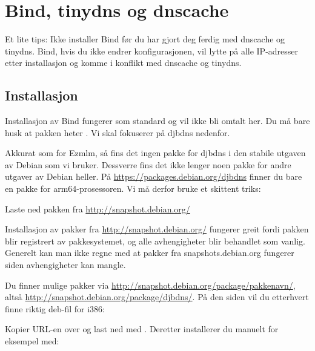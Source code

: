 \chapter{Bind, tinydns og dnscache} %


Et lite tips: Ikke installer Bind før du har gjort deg ferdig med
dnscache og tinydns. Bind, hvis du ikke endrer konfigurasjonen, vil
lytte på alle IP-adresser etter installasjon og komme i konflikt med
dnscache og tinydns.
 
\section{Installasjon}

Installasjon av Bind fungerer som standard og vil ikke bli omtalt her. 
Du må bare husk at pakken heter . Vi skal fokuserer på djbdns nedenfor.

Akkurat som for Ezmlm, så fins det ingen pakke for djbdns i den stabile utgaven av Debian som vi bruker.
Dessverre fins det ikke lenger noen pakke for andre utgaver av Debian heller. 
På \url{https://packages.debian.org/djbdns} finner du bare en pakke for arm64-prosessoren. 
Vi må derfor bruke et skittent triks:

Laste ned pakken fra \url{http://snapshot.debian.org/}

Installasjon av pakker fra \url{http://snapshot.debian.org/} fungerer greit fordi 
pakken blir registrert av pakkesystemet, og alle avhengigheter blir behandlet som vanlig. 
Generelt kan man ikke regne med at pakker fra snapshots.debian.org fungerer siden avhengigheter
kan mangle.

Du finner mulige pakker via \url{http://snapshot.debian.org/package/pakkenavn/}, altså 
\url{http://snapshot.debian.org/package/djbdns/}. På den siden vil du etterhvert finne riktig
deb-fil for i386:


Kopier URL-en over og last ned med . 
Deretter installerer du manuelt for eksempel med:


